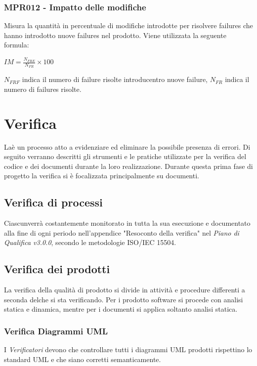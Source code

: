\subsubsection{MPR012 - Impatto delle modifiche}
Misura la quantità in percentuale di modifiche introdotte per risolvere failures che hanno introdotto nuove failures nel prodotto. Viene utilizzata la seguente formula:
\begin{center}{$IM=\frac{N_{FRE}}{N_{FR}}\times 100 $}\end{center}
${N_{FRF}}$ indica il numero di failure risolte introducentro nuove failure, ${N_{FR}}$ indica il numero di failures risolte.





\section{Verifica}
\label{Verifica}
Laè un processo atto a evidenziare ed eliminare la possibile presenza di errori.
Di seguito verranno descritti gli strumenti e le pratiche utilizzate per la verifica del codice e dei documenti durante la loro realizzazione.
Durante questa prima fase di progetto la verifica si è focalizzata principalmente su documenti.
\subsection{Verifica di processi}
Ciascunverrà costantemente monitorato in tutta la sua esecuzione e documentato alla fine di ogni periodo nell'appendice "Resoconto della verifica" nel \textit{Piano di Qualifica v3.0.0}, secondo le metodologie ISO/IEC 15504.

\subsection{Verifica dei prodotti}
La verifica della qualità di prodotto si divide in attività e procedure differenti a seconda delche si sta verificando. Per i prodotto software si procede con analisi statica e dinamica, mentre per i documenti si applica soltanto analisi statica.

\subsubsection{Verifica Diagrammi UML}
I \textit{Verificatori} devono che controllare tutti i diagrammi UML prodotti rispettino lo standard UML e che siano corretti semanticamente.
